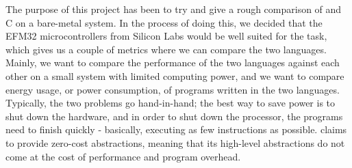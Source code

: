 The purpose of this project has been to try and give a rough comparison of \rust and C on a bare-metal system.
In the process of doing this, we decided that the EFM32 microcontrollers from Silicon Labs would be well suited for the task, which gives us a couple of metrics where we can compare the two languages.
Mainly, we want to compare the performance of the two languages against each other on a small system with limited computing power, and we want to compare energy usage, or power consumption, of programs written in the two languages.
Typically, the two problems go hand-in-hand; the best way to save power is to shut down the hardware, and in order to shut down the processor, the programs need to finish quickly - basically, executing as few instructions as possible.
\rust claims to provide zero-cost abstractions, meaning that its high-level abstractions do not come at the cost of performance and program overhead.

